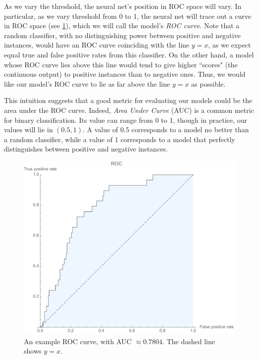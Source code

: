 \documentclass[10pt]{article}
\begin{document}
As we vary the threshold, the neural net's position in ROC space will vary.
In particular, as we vary threshold from 0 to 1, the neural net will trace out a curve in ROC space (see \cref{fig:rocexample}), which we will call the model's \emph{ROC curve}.
Note that a random classifier, with no distinguishing power between positive and negative instances, would have an ROC curve coinciding with the line $y = x$, as we expect equal true and false positive rates from this classifier.
On the other hand, a model whose ROC curve lies above this line would tend to give higher ``scores" (the continuous output) to positive instances than to negative ones.
Thus, we would like our model's ROC curve to lie as far above the line $y = x$ as possible.

This intuition suggests that a good metric for evaluating our models could be the area under the ROC curve.
Indeed, \emph{Area Under Curve} (AUC) is a common metric for binary classification.
Its value can range from 0 to 1, though in practice, our values will lie in $(0.5, 1)$.
A value of 0.5 corresponds to a model no better than a random classifier, while a value of 1 corresponds to a model that perfectly distinguishes between positive and negative instances.

\begin{figure}
\centering
\includegraphics[width=\textwidth]{aux/rocexample.pdf}
\caption{An example ROC curve, with AUC $\approx 0.7804$. The dashed line shows $y = x$.}
\label{fig:rocexample}
\end{figure}
\end{document}
